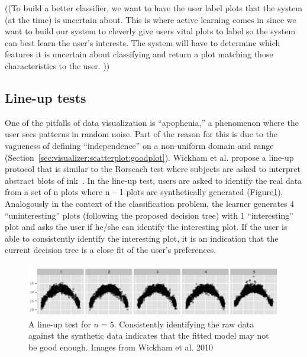 ((To build a better classifier, we want to have the user label plots that the system (at the time) is uncertain about. This is where active learning comes in since we want to build our system to cleverly give users vital plots to label so the system can best learn the user’s interests. The system will have to determine which features it is uncertain about classifying and return a plot matching those characteristics to the user. ))

\subsection{Line-up tests}
\label{sec:visualizer:al:lineup}

One of the pitfalls of data visualization is ``apophenia,'' a phenomenon where the user sees patterns in random noise. Part of the reason for this is due to the vagueness of defining ``independence'' on a non-uniform domain and range (Section~\ref{sec:visualizer:scatterplot:goodplot}). Wickham et al. propose a line-up protocol that is similar to the Rorscach test where subjects are asked to interpret abstract blots of ink~\cite{wickham2010}. In the line-up test, users are asked to identify the real data from a set of n plots where n – 1 plots are synthetically generated (Figure\ref{fig:visualizer:lineup}). Analogously in the context of the classification problem, the learner generates 4 ``uninteresting'' plots (following the proposed decision tree) with 1 ``interesting'' plot and asks the user if he/she can identify the interesting plot. If the user is able to consistently identify the interesting plot, it is an indication that the current decision tree is a close fit of the user’s preferences.

\begin{figure}[htb]
	\begin{center}
		\includegraphics[width=1\linewidth]{ch-visualizer/figures/lineup}
		\caption[A line-up test for $n = 5$. ]{A line-up test for $n = 5$. Consistently identifying the raw data against the synthetic data indicates that the fitted model may not be good enough. Images from Wickham et al. 2010~\cite{wickham2010}}
		\label{fig:visualizer:lineup}
	\end{center}
\end{figure}